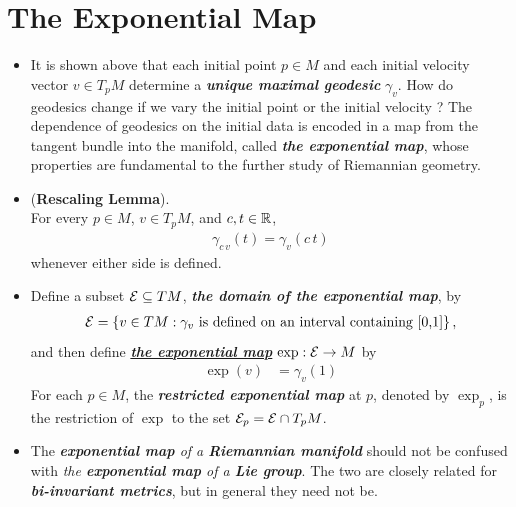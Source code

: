 \documentclass[11pt]{article}
\begin{document}
\section{The Exponential Map}
\begin{itemize}
\item \begin{remark}
It is shown above that each initial point $p\in M$ and each initial velocity vector $v \in T_{p}M$ determine a \emph{\textbf{unique maximal geodesic}} $\gamma_v$. How do geodesics change if we vary the initial point or the initial velocity ?  The dependence of geodesics on the initial data is encoded in a map from the tangent
bundle into the manifold, called \emph{\textbf{the exponential map}}, whose properties are fundamental to the further study of Riemannian geometry. 
\end{remark}

\item \begin{lemma} (\textbf{Rescaling Lemma}).\\
 For every $p\in M$, $v \in T_{p}M$, and $c, t \in {\mathbb R}$,
 \begin{align}
 \gamma_{c\,v}(t) = \gamma_{v}(c\,t) \label{eqn: exp_map_rescaling}
 \end{align} whenever either side is defined.
\end{lemma}

\item \begin{definition}
Define a subset ${\mathcal E} \subseteq  TM$, \emph{\textbf{the domain of the exponential map}}, by
\begin{align*}
{\mathcal E} = \left\{v \in TM: \gamma_v\text{ is defined on an interval containing [0,1]}\right\},
\end{align*}
and then define \underline{\emph{\textbf{the exponential map}}} $\exp: {\mathcal E} \rightarrow M$ by
\begin{align*}
\exp(v)  &= \gamma_{v}(1)
\end{align*}
For each $p \in M$, the \emph{\textbf{restricted exponential map}} at $p$, denoted by $\exp_p$, is the restriction of $\exp$ to the set ${\mathcal E}_p = {\mathcal E} \cap T_{p}M$.
\end{definition}

\item \begin{remark}
The \emph{\textbf{exponential map} of a \textbf{Riemannian manifold}} should not be confused with \emph{the \textbf{exponential map} of a \textbf{Lie group}}. The two are closely related for \emph{\textbf{bi-invariant metrics}}, but in general they need not be. 
\end{remark}


\end{itemize}
\end{document}
